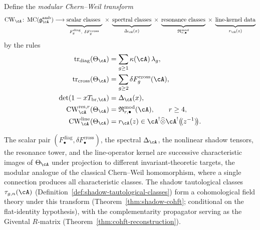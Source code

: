 \begin{definition}
\label{def:modular-chern-weil-transform}
Define the \emph{modular Chern--Weil transform}
\begin{equation}
\label{eq:modular-chern-weil-transform}
\operatorname{CW}_{\cA}\colon
\operatorname{MC}(\mathfrak{g}^{\mathrm{amb}}_{\cA})
\longrightarrow
\underbrace{\vphantom{\bigl(}
\text{scalar classes }}_{F_g^{\mathrm{diag}},\ \delta F_g^{\mathrm{cross}}}
\;\times\;
\underbrace{\vphantom{\bigl(}
\text{spectral classes}}_{\Delta_{\cA}(x)}
\;\times\;
\underbrace{\vphantom{\bigl(}
\text{resonance classes}}_{\mathfrak{R}^{\mathrm{mod}}_{r,\bullet}}
\;\times\;
\underbrace{\vphantom{\bigl(}
\text{line-kernel data}}_{r_{\cA}(z)}
\end{equation}
by the rules
\begin{align}
\operatorname{tr}_{\mathrm{diag}}(\Theta_{\cA})
&= \sum_{g \geq 1}\kappa(\cA)\,\lambda_g,
\qquad \label{eq:cw-scalar}
\\
\operatorname{tr}_{\mathrm{cross}}(\Theta_{\cA})
&= \sum_{g \geq 2}\delta F_g^{\mathrm{cross}}(\cA),
\qquad \label{eq:cw-cross}
\\
\det(1 - xT_{\mathrm{br},\cA})
&= \Delta_{\cA}(x),
\label{eq:cw-spectral}
\\
\operatorname{CW}_{\cA}^{\mathrm{res},r}(\Theta_{\cA})
&= \mathfrak{R}^{\mathrm{mod}}_{r,\bullet}(\cA),
\qquad r \geq 4,
\label{eq:cw-resonance}
\\
\operatorname{CW}_{\cA}^{\mathrm{line}}(\Theta_{\cA})
&= r_{\cA}(z)
\in \cA^!\widehat\otimes \cA^!\bigl(\!(z^{-1})\!\bigr).
\label{eq:cw-line}
\end{align}
\end{definition}

\begin{remark}
The scalar pair
$(F_\bullet^{\mathrm{diag}},\delta F_\bullet^{\mathrm{cross}})$,
the spectral $\Delta_\cA$, the nonlinear shadow tensors, the
resonance tower, and the line-operator kernel are successive characteristic images of
$\Theta_{\cA}$ under projection to
different invariant-theoretic targets, the modular analogue
of the classical Chern--Weil homomorphism, where a single connection
produces all characteristic classes.
The shadow tautological classes $\tau_{g,n}(\cA)$ (Definition~\ref{def:shadow-tautological-classes}) form a cohomological field theory under this transform (Theorem~\ref{thm:shadow-cohft}; conditional on the flat-identity hypothesis), with the complementarity propagator serving as the Givental $R$-matrix (Theorem~\ref{thm:cohft-reconstruction}).
\end{remark}

